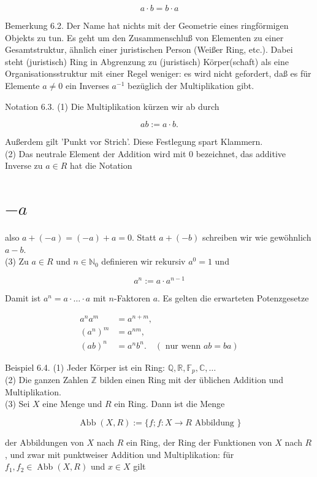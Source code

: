 \documentclass[10pt, letterpaper]{article}
\begin{document}
$$
a \cdot b=b \cdot a
$$

Bemerkung 6.2. Der Name hat nichts mit der Geometrie eines ringförmigen Objekts zu tun. Es geht um den Zusammenschluß von Elementen zu einer Gesamtstruktur, ähnlich einer juristischen Person (Weißer Ring, etc.). Dabei steht (juristisch) Ring in Abgrenzung zu (juristisch) Körper(schaft) als eine Organisationsstruktur mit einer Regel weniger: es wird nicht gefordert, daß es für Elemente $a \neq 0$ ein Inverses $a^{-1}$ bezüglich der Multiplikation gibt.

Notation 6.3. (1) Die Multiplikation kürzen wir ab durch

$$
a b:=a \cdot b .
$$

Außerdem gilt 'Punkt vor Strich'. Diese Festlegung spart Klammern.\\
(2) Das neutrale Element der Addition wird mit 0 bezeichnet, das additive Inverse zu $a \in R$ hat die Notation

\section*{$-a$}
also $a+(-a)=(-a)+a=0$. Statt $a+(-b)$ schreiben wir wie gewöhnlich $a-b$.\\
(3) Zu $a \in R$ und $n \in \mathbb{N}_{0}$ definieren wir rekursiv $a^{0}=1$ und

$$
a^{n}:=a \cdot a^{n-1}
$$

Damit ist $a^{n}=a \cdot \ldots \cdot a$ mit $n$-Faktoren $a$. Es gelten die erwarteten Potenzgesetze

$$
\begin{aligned}
a^{n} a^{m} & =a^{n+m}, \\
\left(a^{n}\right)^{m} & =a^{n m}, \\
(a b)^{n} & =a^{n} b^{n} . \quad(\text { nur wenn } a b=b a)
\end{aligned}
$$

Beispiel 6.4. (1) Jeder Körper ist ein Ring: $\mathbb{Q}, \mathbb{R}, \mathbb{F}_{p}, \mathbb{C}, \ldots$\\
(2) Die ganzen Zahlen $\mathbb{Z}$ bilden einen Ring mit der üblichen Addition und Multiplikation.\\
(3) Sei $X$ eine Menge und $R$ ein Ring. Dann ist die Menge

$$
\operatorname{Abb}(X, R):=\{f ; f: X \rightarrow R \text { Abbildung }\}
$$

der Abbildungen von $X$ nach $R$ ein Ring, der Ring der Funktionen von $X$ nach $R$, und zwar mit punktweiser Addition und Multiplikation: für $f_{1}, f_{2} \in \operatorname{Abb}(X, R)$ und $x \in X$ gilt
\end{document}
